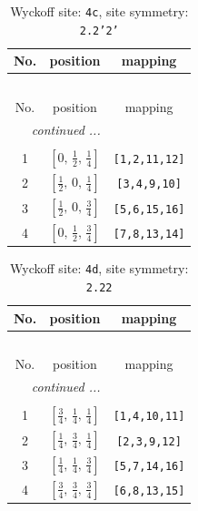 \documentclass[fleqn,8pt]{jsarticle}
\begin{document}
\renewcommand{\arraystretch}{1.2}
\begin{longtable}{ccc}
\caption{Wyckoff site: {\tt 4c}, site symmetry: {\tt 2.2'2'}}
 \\
 \hline \hline
No. & position & mapping \\ \hline \endfirsthead

\multicolumn{2}{l}{\tablename\ \thetable{}} \\
 \hline \hline
No. & position & mapping \\ \hline \endhead

 \hline \hline
\multicolumn{2}{r}{\footnotesize\it continued ...} \\ \endfoot

 \hline \hline
\multicolumn{2}{r}{} \\ \endlastfoot

1 & $\left[ 0,\, \frac{1}{2},\, \frac{1}{4} \right]$ & {\tt [1,2,11,12]} \\ \hline
2 & $\left[ \frac{1}{2},\, 0,\, \frac{1}{4} \right]$ & {\tt [3,4,9,10]} \\ \hline
3 & $\left[ \frac{1}{2},\, 0,\, \frac{3}{4} \right]$ & {\tt [5,6,15,16]} \\ \hline
4 & $\left[ 0,\, \frac{1}{2},\, \frac{3}{4} \right]$ & {\tt [7,8,13,14]} \\
\end{longtable}
\renewcommand{\arraystretch}{1.2}
\begin{longtable}{ccc}
\caption{Wyckoff site: {\tt 4d}, site symmetry: {\tt 2.22}}
 \\
 \hline \hline
No. & position & mapping \\ \hline \endfirsthead

\multicolumn{2}{l}{\tablename\ \thetable{}} \\
 \hline \hline
No. & position & mapping \\ \hline \endhead

 \hline \hline
\multicolumn{2}{r}{\footnotesize\it continued ...} \\ \endfoot

 \hline \hline
\multicolumn{2}{r}{} \\ \endlastfoot

1 & $\left[ \frac{3}{4},\, \frac{1}{4},\, \frac{1}{4} \right]$ & {\tt [1,4,10,11]} \\ \hline
2 & $\left[ \frac{1}{4},\, \frac{3}{4},\, \frac{1}{4} \right]$ & {\tt [2,3,9,12]} \\ \hline
3 & $\left[ \frac{1}{4},\, \frac{1}{4},\, \frac{3}{4} \right]$ & {\tt [5,7,14,16]} \\ \hline
4 & $\left[ \frac{3}{4},\, \frac{3}{4},\, \frac{3}{4} \right]$ & {\tt [6,8,13,15]} \\
\end{longtable}
\end{document}
